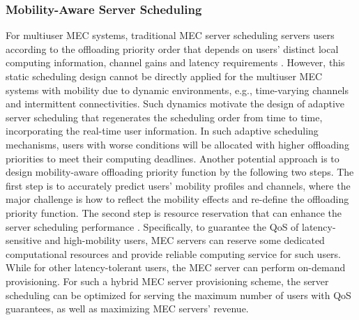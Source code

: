 \documentclass[journal]{IEEEtran}
\begin{document}
{\subsubsection{\textbf{Mobility-Aware Server Scheduling}} For multiuser MEC systems, traditional MEC server scheduling servers users according to the offloading priority order that depends on users' distinct local computing information, channel gains and latency requirements \cite{you2016energy}. However, this static scheduling design cannot be directly applied for the multiuser MEC systems with mobility due to dynamic environments, e.g., time-varying channels and intermittent connectivities. Such dynamics motivate the design of adaptive server scheduling that regenerates the scheduling order from time to time, incorporating the real-time user information. In such adaptive scheduling mechanisms, users with worse conditions will be allocated with higher offloading priorities to meet their computing deadlines. Another potential approach is to design mobility-aware offloading priority function by the following two steps. The first step is to accurately predict users' mobility profiles and channels, where the major challenge is how to reflect the mobility effects and re-define the offloading priority function. The second step is resource reservation that can enhance the server scheduling performance \cite{chaisiri2012optimization,zhang2016reservation}. Specifically, to guarantee the QoS of latency-sensitive and high-mobility users,  MEC servers can reserve some dedicated computational resources and provide reliable computing service for such users. While for other latency-tolerant users, the MEC server can perform on-demand provisioning. For such a hybrid MEC server provisioning scheme, the server scheduling can be optimized for serving the maximum number of users with QoS guarantees, as well as maximizing MEC servers' revenue.


}
\end{document}
